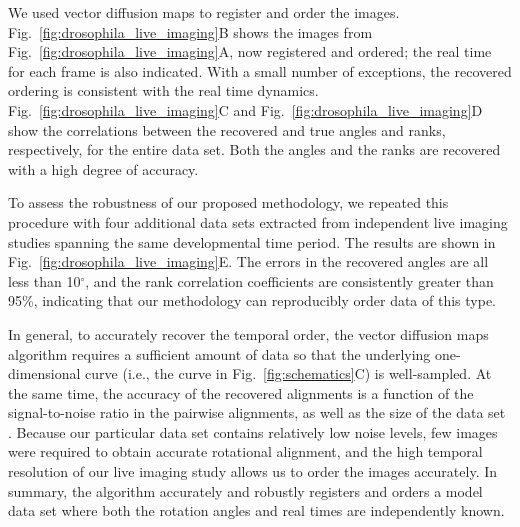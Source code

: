 \documentclass[twocolumn, 10pt]{article}
\newcommand{\fig}[0]{Fig.}
\begin{document}
We used vector diffusion maps to register and order the images. 
%
\fig~\ref{fig:drosophila_live_imaging}B shows the images from \fig~\ref{fig:drosophila_live_imaging}A, now registered and ordered; the real time for each frame is also indicated.
%
With a small number of exceptions, the recovered ordering is consistent with the real time dynamics. 
%
\fig~\ref{fig:drosophila_live_imaging}C and \fig~\ref{fig:drosophila_live_imaging}D  show the correlations between the recovered and true angles and ranks, respectively, for the entire data set. 
%
Both the angles and the ranks are recovered with a high degree of accuracy.

To assess the robustness of our proposed methodology, we repeated this procedure with four additional data sets extracted from independent live imaging studies spanning the same developmental time period. 
%
The results are shown in \fig~\ref{fig:drosophila_live_imaging}E. 
%
The errors in the recovered angles are all less than 10$^\circ$, and the rank correlation coefficients are consistently greater than 95\%, indicating that our methodology can reproducibly order data of this type. 

In general, to accurately recover the temporal order, the vector diffusion maps algorithm requires a sufficient amount of data so that the underlying one-dimensional curve (i.e., the curve in \fig~\ref{fig:schematics}C) is well-sampled.
%
At the same time, the accuracy of the recovered alignments is a function of the signal-to-noise ratio in the pairwise alignments, as well as the size of the data set \citep{singer2011angular}.
%
Because our particular data set contains relatively low noise levels, few images were required to obtain accurate rotational alignment, and the high temporal resolution of our live imaging study allows us to order the images accurately.  
%
In summary, the algorithm accurately and robustly registers and orders a model data set where both the rotation angles and real times are independently known. 
\end{document}

